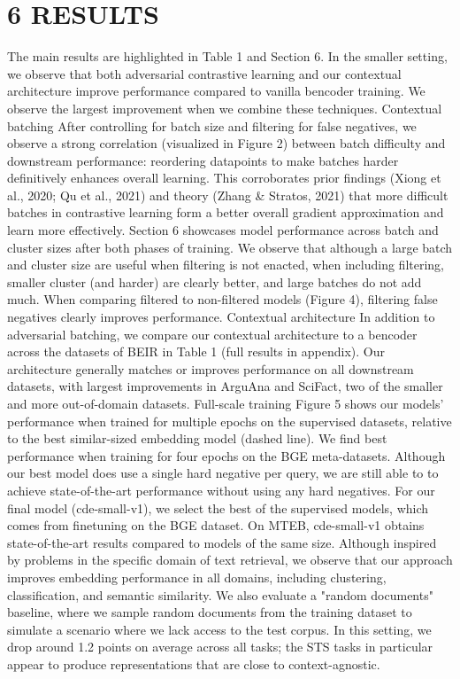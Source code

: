 \section*{6 RESULTS}
The main results are highlighted in Table 1 and Section 6. In the smaller setting, we observe that both adversarial contrastive learning and our contextual architecture improve performance compared to vanilla bencoder training. We observe the largest improvement when we combine these techniques.
Contextual batching After controlling for batch size and filtering for false negatives, we observe a strong correlation (visualized in Figure 2) between batch difficulty and downstream performance: reordering datapoints to make batches harder definitively enhances overall learning. This corroborates prior findings (Xiong et al., 2020; Qu et al., 2021) and theory (Zhang \& Stratos, 2021) that more difficult batches in contrastive learning form a better overall gradient approximation and learn more effectively.
Section 6 showcases model performance across batch and cluster sizes after both phases of training. We observe that although a large batch and cluster size are useful when filtering is not enacted, when including filtering, smaller cluster (and harder) are clearly better, and large batches do not add much. When comparing filtered to non-filtered models (Figure 4), filtering false negatives clearly improves performance.
Contextual architecture In addition to adversarial batching, we compare our contextual architecture to a bencoder across the datasets of BEIR in Table 1 (full results in appendix). Our architecture generally matches or improves performance on all downstream datasets, with largest improvements in ArguAna and SciFact, two of the smaller and more out-of-domain datasets.
Full-scale training Figure 5 shows our models' performance when trained for multiple epochs on the supervised datasets, relative to the best similar-sized embedding model (dashed line). We find best performance when training for four epochs on the BGE meta-datasets. Although our best model does use a single hard negative per query, we are still able to to achieve state-of-the-art performance without using any hard negatives.
For our final model (cde-small-v1), we select the best of the supervised models, which comes from finetuning on the BGE dataset. On MTEB, cde-small-v1 obtains state-of-the-art results compared to models of the same size. Although inspired by problems in the specific domain of text retrieval, we observe that our approach improves embedding performance in all domains, including clustering, classification, and semantic similarity. We also evaluate a "random documents" baseline, where we sample random documents from the training dataset to simulate a scenario where we lack access to the test corpus. In this setting, we drop around 1.2 points on average across all tasks; the STS tasks in particular appear to produce representations that are close to context-agnostic.
